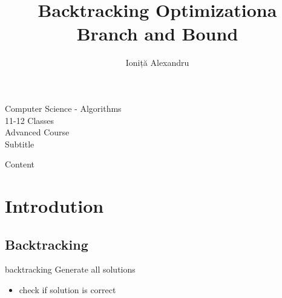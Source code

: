 \documentclass[10pt]{beamer}
\title{Backtracking Optimizationa \\ Branch and Bound}
\author{Ioniță \quad Alexandru }
\institute{Centrul Infogym Iasi}
\begin{document}
\begin{frame}
    \titlepage
\end{frame}


\begin{frame}
\begin{center}
 Computer Science - Algorithms\\
 11-12 Classes\\
 Advanced Course
\\
\color{gray}
Subtitle \\
 
\end{center}
\end{frame}



\begin{frame}[allowframebreaks]
Content
    \tableofcontents
\end{frame}



\section{Introdution}

\subsection{Backtracking}

\begin{frame}{\insertsubsection}

      \begin{block}{backtracking}
      	Generate all solutions

      	\begin{itemize}
      		\item check if solution is correct
      	\end{itemize}

      	
      \end{block}

\end{frame}
\end{document}
